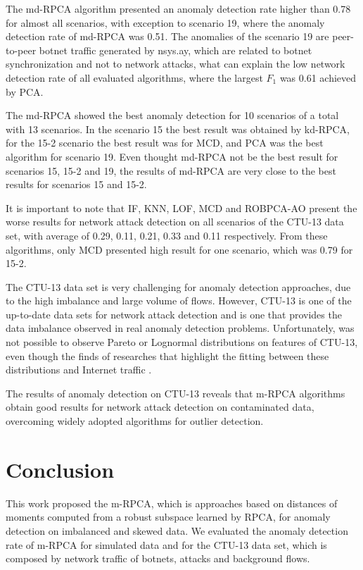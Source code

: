 The md-RPCA algorithm presented an anomaly detection rate higher than 0.78 for almost all scenarios, with exception to scenario 19, where the anomaly detection rate of md-RPCA was 0.51. The anomalies of the scenario 19 are peer-to-peer botnet traffic generated by nsys.ay, which are related to botnet synchronization and not to network attacks, what can explain the low network detection rate of all evaluated algorithms, where the largest $F_1$ was 0.61 achieved by PCA.

The md-RPCA showed the best anomaly detection for 10 scenarios of a total with 13 scenarios. In the scenario 15 the best result was obtained by kd-RPCA, for the 15-2 scenario the best result was for MCD, and PCA was the best algorithm for scenario 19. Even thought md-RPCA not be the best result for scenarios 15, 15-2 and 19, the results of md-RPCA are very close to the best results for scenarios 15 and 15-2.

It is important to note that IF, KNN, LOF, MCD and ROBPCA-AO present the worse results for network attack detection on all scenarios of the CTU-13 data set, with average of 0.29, 0.11, 0.21, 0.33 and 0.11 respectively. From these algorithms, only MCD presented high result for one scenario, which was 0.79 for 15-2.

The CTU-13 data set is very challenging for anomaly detection approaches, due to the high imbalance and large volume of flows. However, CTU-13 is one of the up-to-date data sets for network attack detection and is one that provides the data imbalance observed in real anomaly detection problems. Unfortunately, was not possible to observe Pareto or Lognormal distributions on features of CTU-13, even though the finds of researches that highlight the fitting between these distributions and Internet traffic \cite{benson2010network, leon2017probability}. 

The results of anomaly detection on CTU-13 reveals that m-RPCA algorithms obtain good results for network attack detection on contaminated data, overcoming widely adopted algorithms for outlier detection.


\section{Conclusion}
\label{sec:3_conclusion}

This work proposed the m-RPCA, which is approaches based on distances of moments computed from a robust subspace learned by RPCA, for anomaly detection on imbalanced and skewed data. We evaluated the anomaly detection rate of m-RPCA for simulated data and for the CTU-13 data set, which is composed by network traffic of botnets, attacks and background flows.

